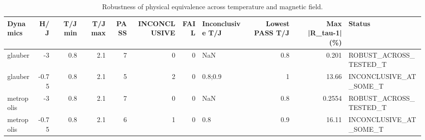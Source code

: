 \begin{table}
\caption{Robustness of physical equivalence across temperature and magnetic field.}
\label{tab:temperature_field}
\begin{tabular}{lrrrrrrlrrl}
\toprule
Dynamics & H/J & T/J min & T/J max & PASS & INCONCLUSIVE & FAIL & Inconclusive T/J & Lowest PASS T/J & Max |R\_tau-1| (\%) & Status \\
\midrule
glauber & -3 & 0.8 & 2.1 & 7 & 0 & 0 & NaN & 0.8 & 0.201 & ROBUST\_ACROSS\_TESTED\_T \\
glauber & -0.75 & 0.8 & 2.1 & 5 & 2 & 0 & 0.8;0.9 & 1 & 13.66 & INCONCLUSIVE\_AT\_SOME\_T \\
metropolis & -3 & 0.8 & 2.1 & 7 & 0 & 0 & NaN & 0.8 & 0.2554 & ROBUST\_ACROSS\_TESTED\_T \\
metropolis & -0.75 & 0.8 & 2.1 & 6 & 1 & 0 & 0.8 & 0.9 & 16.11 & INCONCLUSIVE\_AT\_SOME\_T \\
\bottomrule
\end{tabular}
\end{table}
